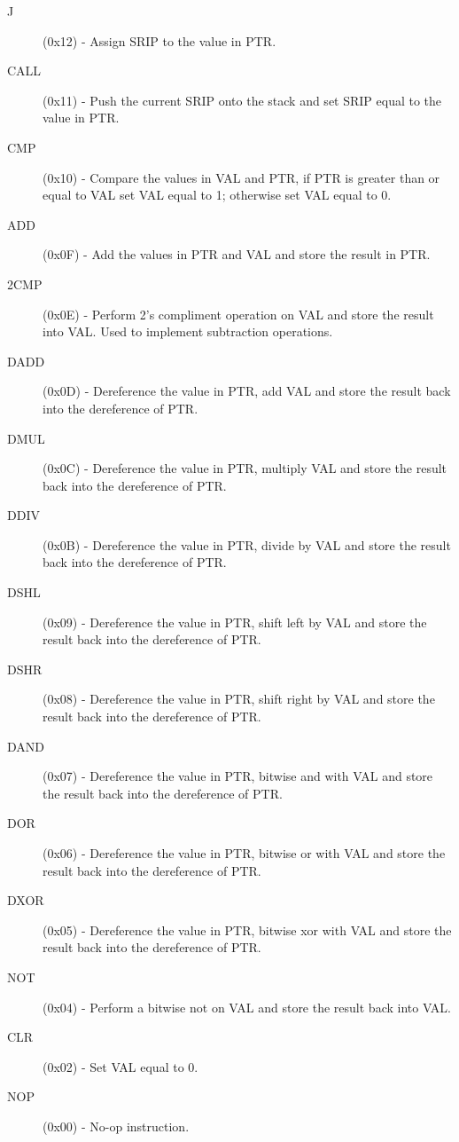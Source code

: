 \begin{description}
\item[J] (0x12) - 
Assign SRIP to the value in PTR.

\item[CALL] (0x11) - 
Push the current SRIP onto the stack and set SRIP equal to the value in PTR.

\item[CMP] (0x10) - 
Compare the values in VAL and PTR, if PTR is greater than or equal to VAL
set VAL equal to 1; otherwise set VAL equal to 0. 

\item[ADD] (0x0F) - 
Add the values in PTR and VAL and store the result in PTR.

\item[2CMP] (0x0E) - 
Perform 2's compliment operation on VAL and store the result into VAL.
Used to implement subtraction operations.

\item[DADD] (0x0D) - 
Dereference the value in PTR, add VAL and store the result back into the dereference 
of PTR. 

\item[DMUL] (0x0C) - 
Dereference the value in PTR, multiply VAL and store the result back into the dereference
 of PTR. 

\item[DDIV] (0x0B) - 
Dereference the value in PTR, divide by VAL and store the result back into the 
dereference of PTR. 

\item[DSHL] (0x09) - 
Dereference the value in PTR, shift left by VAL and store the result back into the 
dereference of PTR. 

\item[DSHR] (0x08) - 
Dereference the value in PTR, shift right by VAL and store the result back into the 
dereference of PTR. 

\item[DAND] (0x07) - 
Dereference the value in PTR, bitwise and with VAL and store the result back into the 
dereference of PTR. 

\item[DOR] (0x06) - 
Dereference the value in PTR, bitwise or with VAL and store the result back into the 
dereference of PTR. 

\item[DXOR] (0x05) - 
Dereference the value in PTR, bitwise xor with VAL and store the result back into the 
dereference of PTR. 

\item[NOT] (0x04) - 
Perform a bitwise not on VAL and store the result back into VAL. 

\item[CLR] (0x02) - 
Set VAL equal to 0. 

\item[NOP] (0x00) - 
No-op instruction.
\end{description}

